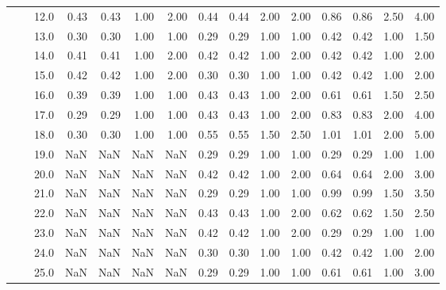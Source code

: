 \begin{tabular}{lllrrrrrrrrrrrr}
       &     & 12.0 &       0.43 &      0.43 & 1.00 &   2.00 &       0.44 &      0.44 & 2.00 &   2.00 &       0.86 &      0.86 & 2.50 &   4.00 \\
       &     & 13.0 &       0.30 &      0.30 & 1.00 &   1.00 &       0.29 &      0.29 & 1.00 &   1.00 &       0.42 &      0.42 & 1.00 &   1.50 \\
       &     & 14.0 &       0.41 &      0.41 & 1.00 &   2.00 &       0.42 &      0.42 & 1.00 &   2.00 &       0.42 &      0.42 & 1.00 &   2.00 \\
       &     & 15.0 &       0.42 &      0.42 & 1.00 &   2.00 &       0.30 &      0.30 & 1.00 &   1.00 &       0.42 &      0.42 & 1.00 &   2.00 \\
       &     & 16.0 &       0.39 &      0.39 & 1.00 &   1.00 &       0.43 &      0.43 & 1.00 &   2.00 &       0.61 &      0.61 & 1.50 &   2.50 \\
       &     & 17.0 &       0.29 &      0.29 & 1.00 &   1.00 &       0.43 &      0.43 & 1.00 &   2.00 &       0.83 &      0.83 & 2.00 &   4.00 \\
       &     & 18.0 &       0.30 &      0.30 & 1.00 &   1.00 &       0.55 &      0.55 & 1.50 &   2.50 &       1.01 &      1.01 & 2.00 &   5.00 \\
       &     & 19.0 &        NaN &       NaN &  NaN &    NaN &       0.29 &      0.29 & 1.00 &   1.00 &       0.29 &      0.29 & 1.00 &   1.00 \\
       &     & 20.0 &        NaN &       NaN &  NaN &    NaN &       0.42 &      0.42 & 1.00 &   2.00 &       0.64 &      0.64 & 2.00 &   3.00 \\
       &     & 21.0 &        NaN &       NaN &  NaN &    NaN &       0.29 &      0.29 & 1.00 &   1.00 &       0.99 &      0.99 & 1.50 &   3.50 \\
       &     & 22.0 &        NaN &       NaN &  NaN &    NaN &       0.43 &      0.43 & 1.00 &   2.00 &       0.62 &      0.62 & 1.50 &   2.50 \\
       &     & 23.0 &        NaN &       NaN &  NaN &    NaN &       0.42 &      0.42 & 1.00 &   2.00 &       0.29 &      0.29 & 1.00 &   1.00 \\
       &     & 24.0 &        NaN &       NaN &  NaN &    NaN &       0.30 &      0.30 & 1.00 &   1.00 &       0.42 &      0.42 & 1.00 &   2.00 \\
       &     & 25.0 &        NaN &       NaN &  NaN &    NaN &       0.29 &      0.29 & 1.00 &   1.00 &       0.61 &      0.61 & 1.00 &   3.00 \\

\end{tabular}
